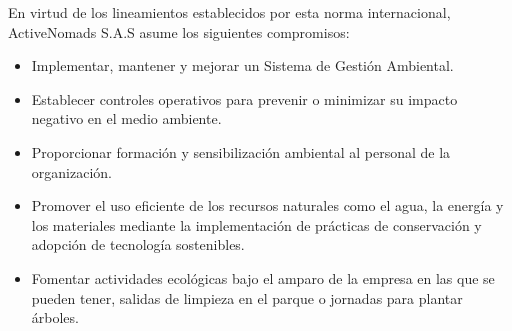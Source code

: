 {En virtud de los lineamientos establecidos por esta norma internacional, ActiveNomads S.A.S asume los siguientes compromisos: 

\begin{itemize}
    \item Implementar, mantener y mejorar un Sistema de Gestión Ambiental. 
    
    \item Establecer controles operativos para prevenir o minimizar su impacto negativo en el medio ambiente. 
    
    \item Proporcionar formación y sensibilización ambiental al personal de la organización.
    
    \item Promover el uso eficiente de los recursos naturales como el agua, la energía y los materiales mediante la implementación de prácticas de conservación y adopción de tecnología sostenibles. 
    
    \item Fomentar actividades ecológicas bajo el amparo de la empresa en las que se pueden tener, salidas de limpieza en el parque o jornadas para plantar árboles.
    
\end{itemize}
}